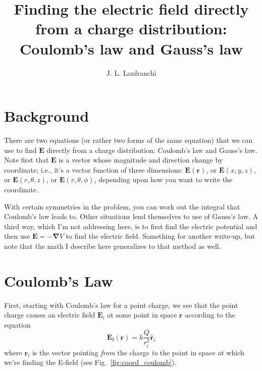 \documentclass[10pt,letterpaper,twoside]{article}
\author{J. L. Lanfranchi}
\title{Finding the electric field directly from a charge distribution:\\
Coulomb's law and Gauss's law}
\begin{document}
 
\twocolumn
\maketitle
\section{Background}
There are two equations (or rather two forms of the same equation) that we can use to find $\bm E$ directly from a charge distribution: Coulomb's law and Gauss's law.
Note first that $\bm E$ is a vector whose magnitude and direction change by coordinate; i.e., it's a vector function of three dimensions: $\bm E(\bm r)$, or $\bm E(x,y,z)$, or $\bm E(r,\theta,z)$, or $\bm E(r,\theta,\phi)$, depending upon how you want to write the coordinate.

With certain symmetries in the problem, you can work out the integral that Coulomb's law leads to. Other situations lend themselves to use of Gauss's law.
A third way, which I'm not addressing here, is to first find the electric potential and then use $\bm E=-\bm\nabla V$ to find the electric field.
Something for another write-up, but note that the math I describe here generalizes to that method as well.

\section{Coulomb's Law}
First, starting with Coulomb's law for a point charge, we see that the point charge causes an electric field $\bm E_i$ at some point in space $\bm r$ according to the equation
\begin{equation}\bm{E_i(r)} = k\frac{Q}{r_i^2}\bm{\hat r}_i \label{eqn:coulomb0}\end{equation}
where $\bm{r}_i$ is the vector pointing \textit{from} the charge \textit{to} the point in space at which we're finding the E-field (see Fig.~\ref{fig:coord_coulomb}).
\end{document}
